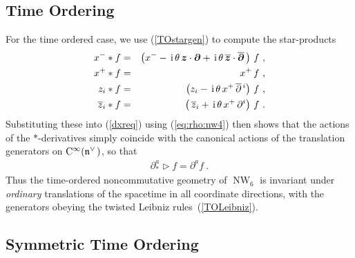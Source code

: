 \documentclass[11pt,a4paper]{article}
\DeclareMathOperator{\NW}{NW}
\newcommand{\1}{\mathbb{1}}
\newcommand{\mbf}[1]{{\boldsymbol {#1} }}
\def\ii{{\,{\rm i}\,}}
\def\CC{{\rm C}}
\def\mz{{\mbf z}}
\def\mdell{{\mbf\partial}}
\def\mfn{{\mathfrak n}}
\def\bea{\begin{eqnarray}}
\def\eea{\end{eqnarray}}
\newcommand{\beq}{\begin{eqnarray}}
\newcommand{\eeq}{\end{eqnarray}}
\begin{document}
\subsection{Time Ordering \label{TOderiv}}

For the time ordered case, we use (\ref{TOstargen}) to compute the
star-products
\bea
x^-*f&=&\left(x^--\ii\theta\,\mz\cdot\mdell+\ii\theta\,
\overline{\mz}\cdot\overline{\mdell}\,\right)\,f \ , \nonumber\\
x^+*f&=&x^+\,f \ , \nonumber\\
z_i*f&=&\left(z_i-\ii\theta\,x^+\,\overline{\partial}{}^{\,i}
\right)\, f \ , \nonumber\\
\overline{z}_i*f&=&\left(\,\overline{z}_i+\ii\theta\,x^+\,\partial^i
\right)\,f \ .
\label{TOxfprods}\eea
Substituting these into (\ref{dxreq}) using (\ref{eq:rho:nw4}) then
shows that the actions of the $*$-derivatives simply coincide with the
canonical actions of the translation generators on
$\CC^\infty(\mfn^{\vee\,})$, so that
\beq
\partial_*^a\triangleright f=\partial^af \ .
\label{TOderivs}\eeq
Thus the time-ordered noncommutative geometry of $\NW_6$ is invariant
under {\it ordinary} translations of the spacetime in all coordinate
directions, with the generators obeying the twisted Leibniz
rules~(\ref{TOLeibniz}).

\subsection{Symmetric Time Ordering \label{STOderiv}}
\end{document}

